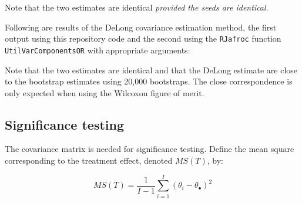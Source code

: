 \documentclass[
]{book}
\newenvironment{Shaded}{\begin{snugshade}}{\end{snugshade}}
\newcommand{\CommentTok}[1]{\textcolor[rgb]{0.56,0.35,0.01}{\textit{#1}}}
\newcommand{\DataTypeTok}[1]{\textcolor[rgb]{0.13,0.29,0.53}{#1}}
\newcommand{\KeywordTok}[1]{\textcolor[rgb]{0.13,0.29,0.53}{\textbf{#1}}}
\newcommand{\NormalTok}[1]{#1}
\newcommand{\OperatorTok}[1]{\textcolor[rgb]{0.81,0.36,0.00}{\textbf{#1}}}
\newcommand{\StringTok}[1]{\textcolor[rgb]{0.31,0.60,0.02}{#1}}
\begin{document}
Note that the two estimates are identical \emph{provided the seeds are identical}.

Following are results of the DeLong covariance estimation method, the first output using this repository code and the second using the \texttt{RJafroc} function \texttt{UtilVarComponentsOR} with appropriate arguments:

\begin{Shaded}
\end{Shaded}

Note that the two estimates are identical and that the DeLong estimate are close to the bootstrap estimates using 20,000 bootstraps. The close correspondence is only expected when using the Wilcoxon figure of merit.

\hypertarget{significance-testing}{%
\subsection{Significance testing}\label{significance-testing}}

The covariance matrix is needed for significance testing. Define the mean square corresponding to the treatment effect, denoted \(MS(T)\), by:

\begin{equation}
MS(T)=\frac{1}{I-1}\sum_{i=1}^{I}(\theta_i-\theta_\bullet)^2
\label{eq:DefinitionMST}
\end{equation}
\end{document}

